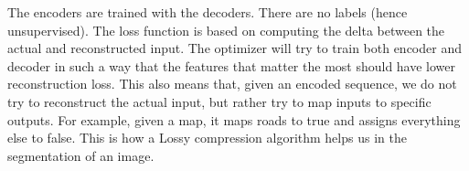 
The encoders are trained with the decoders. There are no labels (hence unsupervised). The loss function is based on computing the delta between the actual and reconstructed input. The optimizer will try to train both encoder and decoder in such a way that the features that matter the most should have lower reconstruction loss. This also means that, given an encoded sequence, we do not try to reconstruct the actual input, but rather try to map inputs to specific outputs. For example, given a map, it maps roads to true and assigns everything else to false. This is how a Lossy compression algorithm helps us in the segmentation of an image.














